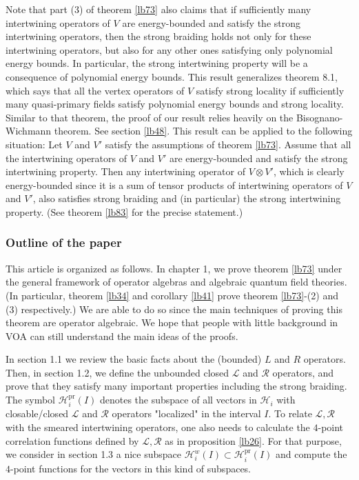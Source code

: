 \documentclass[11pt,b5paper,notitlepage]{article}
\theoremstyle{definition}
\theoremstyle{plain}
\newcommand{\mc}{\mathcal}
\newcommand{\scr}{\mathscr}
\newcommand{\pr}{\mathrm{pr}}
\numberwithin{equation}{subsection}
\begin{document}
Note that part (3) of theorem \ref{lb73} also claims that if sufficiently many intertwining operators of $V$ are energy-bounded and satisfy the strong intertwining operators, then the strong braiding holds not only for these intertwining operators, but also for any other ones satisfying only polynomial energy bounds. In particular, the strong intertwining property will be a consequence of polynomial energy bounds. This result generalizes \cite{CKLW18} theorem 8.1, which says that all the vertex operators of $V$ satisfy strong locality if sufficiently many quasi-primary fields satisfy polynomial energy bounds and strong locality. Similar to that theorem, the proof of our result relies heavily on the Bisognano-Wichmann theorem. See section \ref{lb48}. This result can be applied to the following situation: Let $V$ and $V'$ satisfy the assumptions of theorem \ref{lb73}. Assume that all the intertwining operators of $V$ and $V'$ are energy-bounded and satisfy the strong intertwining property. Then any intertwining operator of $V\otimes V'$, which is clearly energy-bounded since it is a sum of tensor products of intertwining operators of $V$ and $V'$, also satisfies  strong braiding and (in particular) the strong intertwining property. (See theorem \ref{lb83} for the precise statement.) 













\subsubsection*{Outline of the paper}

This article is organized as follows. In chapter 1, we prove theorem \ref{lb73} under the general framework of operator algebras and algebraic quantum field theories. (In particular, theorem \ref{lb34} and corollary \ref{lb41} prove theorem \ref{lb73}-(2) and  (3) respectively.) We are able to do so since the main techniques of proving this theorem are operator algebraic. We hope that people with little background in VOA can still understand the main ideas of the proofs.

In section 1.1 we review the basic facts about the  (bounded) $L$ and $R$ operators. Then, in section 1.2, we define  the unbounded closed $\scr L$ and $\scr R$ operators, and prove that they satisfy many important properties including the strong braiding. The symbol $\mc H_i^\pr(I)$ denotes the subspace  of all vectors in $\mc H_i$ with closable/closed $\scr L$ and $\scr R$ operators "localized" in the interval $I$. To relate $\scr L,\scr R$ with the smeared intertwining operators, one also needs to calculate the $4$-point correlation functions defined by $\scr L,\scr R$ as in proposition \ref{lb26}. For that purpose, we consider in section 1.3 a nice subspace $\mc H_i^w(I)\subset \mc H_i^\pr(I)$ and compute the $4$-point functions for the vectors in this kind of subspaces.
\end{document}
